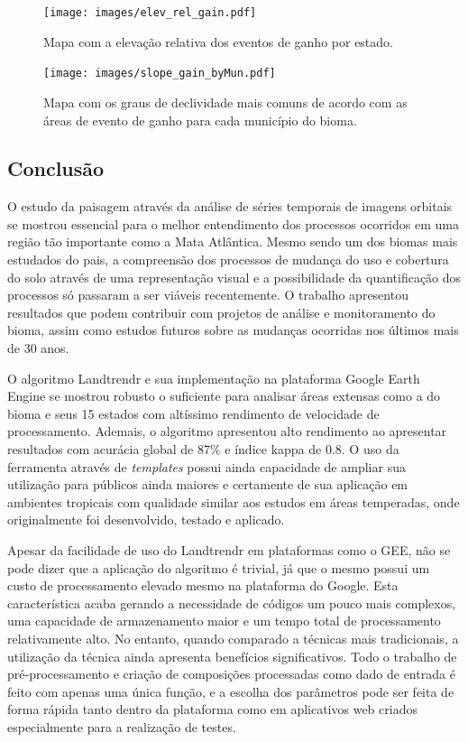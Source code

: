 \begin{figure}[H]
    \centering
    \texttt{[image: images/elev\_rel\_gain.pdf]}
    \caption{Mapa com a elevação relativa dos eventos de ganho por estado.}
    \label{fig:elev_rel_gain}
\end{figure}

\begin{figure}[H]
    \centering
    \texttt{[image: images/slope\_gain\_byMun.pdf]}
    \caption{Mapa com os graus de declividade mais comuns de acordo com as áreas de evento de ganho para cada município do bioma.}
    \label{fig:slope_gain_byMun}
\end{figure}

\subsection{Conclusão}

\hspace{13pt} O estudo da paisagem através da análise de séries temporais de imagens orbitais se mostrou essencial para o melhor entendimento dos processos ocorridos em uma região tão importante como a Mata Atlântica. Mesmo sendo um dos biomas mais estudados do pais, a compreensão dos processos de mudança do uso e cobertura do solo através de uma representação visual e a possibilidade da quantificação dos processos só passaram a ser viáveis recentemente. O trabalho apresentou resultados que podem contribuir com projetos de análise e monitoramento do bioma, assim como estudos futuros sobre as mudanças ocorridas nos últimos mais de 30 anos. 

O algoritmo Landtrendr e sua implementação na plataforma Google Earth Engine se mostrou robusto o suficiente para analisar áreas extensas como a do bioma e seus 15 estados com altíssimo rendimento de velocidade de processamento. Ademais, o algoritmo apresentou alto rendimento ao apresentar resultados com acurácia global de 87\% e índice kappa de 0.8. O uso da ferramenta através de \textit{templates} possui ainda capacidade de ampliar sua utilização para públicos ainda maiores e certamente de sua aplicação em ambientes tropicais com qualidade similar aos estudos em áreas temperadas, onde originalmente foi desenvolvido, testado e aplicado.

Apesar da facilidade de uso do Landtrendr em plataformas como o GEE, não se pode dizer que a aplicação do algoritmo é trivial, já que o mesmo possui um custo de processamento elevado mesmo na plataforma do Google. Esta característica acaba gerando a necessidade de códigos um pouco mais complexos, uma capacidade de armazenamento maior e um tempo total de processamento relativamente alto. No entanto, quando comparado a técnicas mais tradicionais, a utilização da técnica ainda apresenta benefícios significativos. Todo o trabalho de pré-processamento e criação de composições processadas como dado de entrada é feito com apenas uma única função, e a escolha dos parâmetros pode ser feita de forma rápida tanto dentro da plataforma como em aplicativos web criados especialmente para a realização de testes. 

